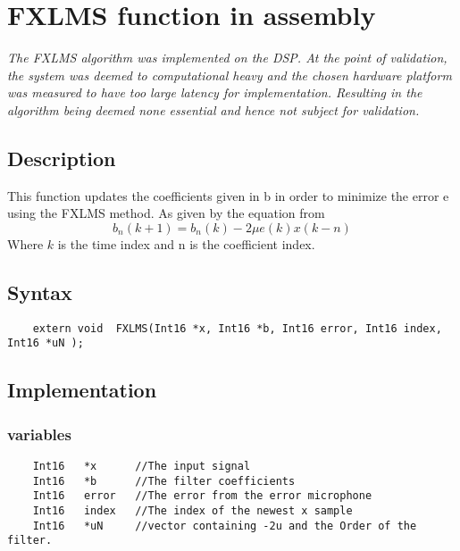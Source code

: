 
\section{FXLMS function in assembly}

\textit{The FXLMS algorithm was implemented on the DSP. At the point of validation, the system was deemed to computational heavy and the chosen hardware platform was measured to have too large latency for implementation. Resulting in the algorithm being deemed none essential and hence not subject for validation.} 

\subsection{Description}
This function updates the coefficients given in b in order to minimize the error e using the FXLMS method. As given by the equation from 
\begin{equation}
	b_n(k+1)=b_n(k)-2\mu e(k)x(k-n)
\end{equation}
Where $k$ is the time index and n is the coefficient index.

\subsection{Syntax} 
\begin{lstlisting}
	extern void  FXLMS(Int16 *x, Int16 *b, Int16 error, Int16 index, Int16 *uN );
\end{lstlisting}

\subsection{Implementation}

\subsubsection{variables}
\begin{lstlisting}
	Int16 	*x 		//The input signal
	Int16	*b		//The filter coefficients
	Int16	error	//The error from the error microphone
	Int16	index	//The index of the newest x sample
	Int16	*uN		//vector containing -2u and the Order of the filter.
\end{lstlisting}

